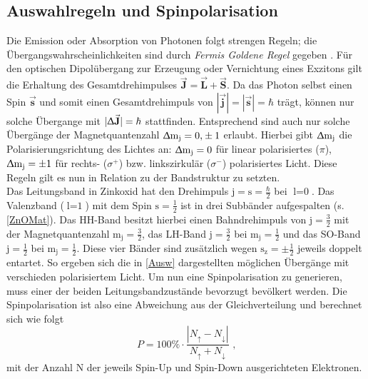 \subsection{Auswahlregeln und Spinpolarisation} \label{AusR} Die Emission oder
Absorption von Photonen folgt strengen Regeln; die Übergangswahrscheinlichkeiten
sind durch \textit{Fermis Goldene Regel} gegeben \cite{Dirac.1927}. Für den
optischen Dipolübergang zur Erzeugung oder Vernichtung eines Exzitons gilt die
Erhaltung des Gesamtdrehimpulses
$\vec{\textbf{J}}=\vec{\textbf{L}}+\vec{\textbf{S}}$. Da das Photon selbst einen
Spin $\vec{\textbf{s}}$ und somit einen Gesamtdrehimpuls von
$|\vec{\textbf{j}}|=|\vec{\textbf{s}}|=\hbar$ trägt, können nur solche Übergange
mit $|\Updelta \vec{\textbf{J}}|=\hbar$ stattfinden. Entsprechend sind auch nur
solche Übergänge der Magnetquantenzahl $\Updelta \text{m}_\text{j}=\text{0,}\pm
\text{1}$ erlaubt. Hierbei gibt $\Updelta\text{m}_\text{j}$ die
Polarisierungsrichtung des Lichtes an: $\Updelta\text{m}_\text{j}=\text{0}$ für
linear polarisiertes ($\pi$), $\Updelta\text{m}_\text{j}=\pm\text{1}$ für
rechts- ($\sigma^{+}$) bzw. linkszirkulär ($\sigma^{-}$) polarisiertes Licht.
Diese Regeln gilt es nun in Relation zu der Bandstruktur zu setzten.\\ Das
Leitungsband in Zinkoxid hat den Drehimpuls
$\text{j}=\text{s}=\frac{\hbar}{\text{2}}$ bei $\text{l}=\text{0}$. Das
Valenzband ($\text{l}=\text{1}$) mit dem Spin $\text{s}=\frac{1}{2}$ ist in drei
Subbänder aufgespalten (s. \autoref{ZnOMat}). Das HH-Band besitzt hierbei einen
Bahndrehimpuls von $\text{j}=\frac{3}{2}$ mit der Magnetquantenzahl
$\text{m}_\text{j}=\frac{3}{2}$, das LH-Band $\text{j}=\frac{3}{2}$ bei
$\text{m}_\text{j}=\frac{1}{2}$ und das SO-Band $\text{j}=\frac{1}{2}$ bei
$\text{m}_\text{j}=\frac{1}{2}$. Diese vier Bänder sind zusätzlich wegen
$\text{s}_\text{z}=\pm\frac{1}{2}$ jeweils doppelt entartet. So ergeben sich die
in \autoref{Ausw} dargestellten möglichen Übergänge mit verschieden
polarisiertem Licht. Um nun eine Spinpolarisation zu generieren, muss einer der
beiden Leitungsbandzustände bevorzugt bevölkert werden. Die Spinpolarisation ist
also eine Abweichung aus der Gleichverteilung und berechnet sich wie folgt
\begin{equation} P=100\%\cdot \frac{\left| N_\uparrow-
N_\downarrow\right|}{N_\uparrow+ N_\downarrow} \text{ ,} \end{equation} mit der
Anzahl N der jeweils Spin-Up und Spin-Down ausgerichteten  Elektronen.
